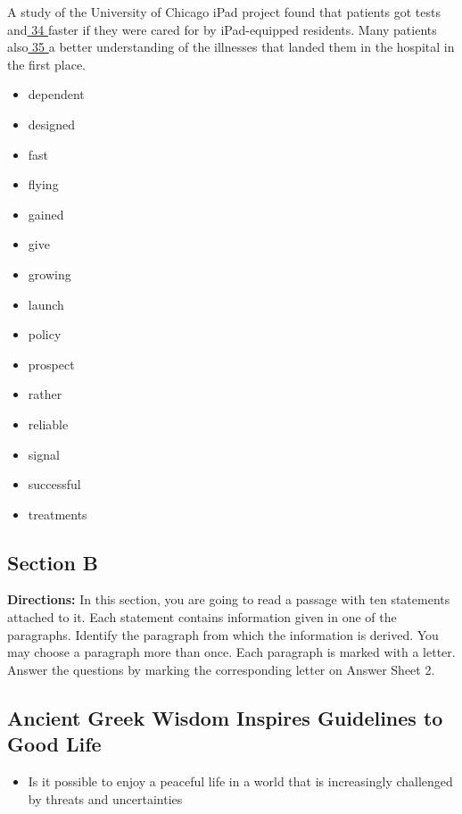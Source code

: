\documentclass[UTF8,11pt]{ctexart}
\begin{document}
A study of the University of Chicago iPad project found that patients got tests and\uline{ 34 }faster if they were cared for by iPad-equipped residents. Many patients also\uline{ 35 }a better understanding of the illnesses that landed them in the hospital in the first place.


\begin{itemize}[leftmargin=2em,itemsep=.2em,topsep=.4em]\item[A.] dependent
\item[B.] designed
\item[C.] fast
\item[D.] flying
\item[E.] gained
\item[F.] give
\item[G.] growing
\item[H.] launch
\item[I.] policy
\item[J.] prospect
\item[K.] rather
\item[L.] reliable
\item[M.] signal
\item[N.] successful
\item[O.] treatments
\end{itemize}

\subsection*{\textbf{Section B}}


\textbf{Directions:} In this section, you are going to read a passage with ten statements attached to it. Each statement contains information given in one of the paragraphs. Identify the paragraph from which the information is derived. You may choose a paragraph more than once. Each paragraph is marked with a letter. Answer the questions by marking the corresponding letter on Answer Sheet 2.


\subsection*{\textbf{Ancient Greek Wisdom Inspires Guidelines to Good Life}}


\begin{itemize}[leftmargin=2em,itemsep=.2em,topsep=.4em]\item[A.] Is it possible to enjoy a peaceful life in a world that is increasingly challenged by threats and uncertainties
\end{itemize}
\end{document}
